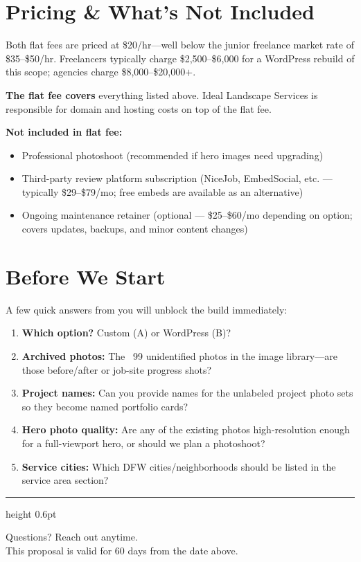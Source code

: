 \documentclass[11pt, letterpaper]{article}
\begin{document}
\section{Pricing \& What's Not Included}

Both flat fees are priced at \$20/hr---well below the junior freelance market
rate of \$35--\$50/hr. Freelancers typically charge \$2,500--\$6,000 for a
WordPress rebuild of this scope; agencies charge \$8,000--\$20,000$+$.

\textbf{The flat fee covers} everything listed above. Ideal Landscape Services is responsible for
domain and hosting costs on top of the flat fee.

\textbf{Not included in flat fee:}
\begin{itemize}
  \item Professional photoshoot (recommended if hero images need upgrading)
  \item Third-party review platform subscription (NiceJob, EmbedSocial, etc.
        --- typically \$29--\$79/mo; free embeds are available as an alternative)
  \item Ongoing maintenance retainer (optional --- \$25--\$60/mo depending on
        option; covers updates, backups, and minor content changes)
\end{itemize}

\section{Before We Start}

A few quick answers from you will unblock the build immediately:

\begin{enumerate}
  \item \textbf{Which option?} Custom (A) or WordPress (B)?
  \item \textbf{Archived photos:} The ~99 unidentified photos in the image
        library---are those before/after or job-site progress shots?
  \item \textbf{Project names:} Can you provide names for the unlabeled
        project photo sets so they become named portfolio cards?
  \item \textbf{Hero photo quality:} Are any of the existing photos
        high-resolution enough for a full-viewport hero, or should we
        plan a photoshoot?
  \item \textbf{Service cities:} Which DFW cities/neighborhoods should be
        listed in the service area section?
\end{enumerate}

\vspace{12pt}
{\color{accent}\hrule height 0.6pt}
\vspace{8pt}

\begin{center}
  \small\color{midgray}
  Questions? Reach out anytime.\\
  This proposal is valid for 60 days from the date above.
\end{center}
\end{document}
